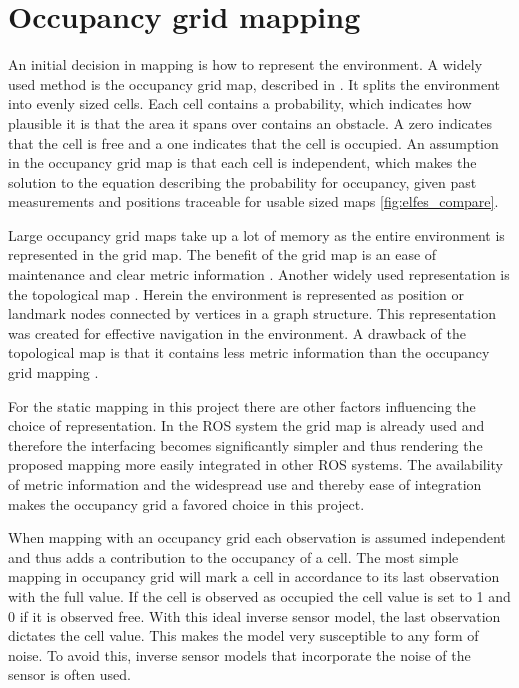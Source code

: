 \section{Occupancy grid mapping}
\label{sec:occupancy_grid_mapping}

An initial decision in mapping is how to represent the environment. A widely used method is the occupancy grid map, described in \cite{elfesMoravecOccGrid}. It splits the environment into evenly sized cells. 
Each cell contains a probability, which indicates how plausible it is that the area it spans over contains an obstacle.
A zero indicates that the cell is free and a one indicates that the cell is occupied.
An assumption in the occupancy grid map is that each cell is independent, which makes the solution to the equation describing the probability for occupancy, given past measurements and positions traceable for usable sized maps \ref{fig:elfes_compare}. 

Large occupancy grid maps take up a lot of memory as the entire environment is represented in the grid map. 
The benefit of the grid map is an ease of maintenance and clear metric information \cite{mapbuildingSummary}. 
Another widely used representation is the topological map \cite{topologyOrig}. 
Herein the environment is represented as position or landmark nodes connected by vertices in a graph structure. 
This representation was created for effective navigation in the environment. 
A drawback of the topological map is that it contains less metric information than the occupancy grid mapping \cite{mapbuildingSummary}.

For the static mapping in this project there are other factors influencing the choice of representation. In the ROS system the grid map is already used and therefore the interfacing becomes significantly simpler and thus rendering the proposed mapping more easily integrated in other ROS systems. The availability of metric information and the widespread use and thereby ease of integration makes the occupancy grid a favored choice in this project. 

When mapping with an occupancy grid each observation is assumed independent and thus adds a contribution to the occupancy of a cell. The most simple mapping in occupancy grid will mark a cell in accordance to its last observation with the full value. If the cell is observed as occupied the cell value is set to 1 and 0 if it is observed free.
With this ideal inverse sensor model, the last observation dictates the cell value. 
This makes the model very susceptible to any form of noise. 
To avoid this, inverse sensor models that incorporate the noise of the sensor is often used.

